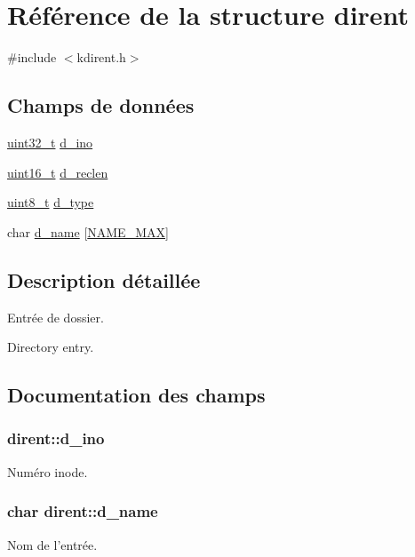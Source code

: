 \hypertarget{structdirent}{\section{Référence de la structure dirent}
\label{structdirent}
}


{\ttfamily \#include $<$kdirent.\+h$>$}

\subsection*{Champs de données}
\begin{DoxyCompactItemize}
\item 
\hyperlink{kernel_2include_2types_8h_a33594304e786b158f3fb30289278f5af}{uint32\+\_\+t} \hyperlink{structdirent_a0ed2e5ea3c71500f628914bf3966e4ba}{d\+\_\+ino}
\item 
\hyperlink{kernel_2include_2types_8h_adf4d876453337156dde61095e1f20223}{uint16\+\_\+t} \hyperlink{structdirent_a7cc67dd4ba5a8bed7f107f249957688d}{d\+\_\+reclen}
\item 
\hyperlink{kernel_2include_2types_8h_aba7bc1797add20fe3efdf37ced1182c5}{uint8\+\_\+t} \hyperlink{structdirent_a948760e3b7f607213a19f85e7af15a32}{d\+\_\+type}
\item 
char \hyperlink{structdirent_a4325a83c49c6f2cd01ef80e1ae1dd4c5}{d\+\_\+name} \mbox{[}\hyperlink{dirent_8h_ac64541bdd81c961304b9babef1402640}{N\+A\+M\+E\+\_\+\+M\+A\+X}\mbox{]}
\end{DoxyCompactItemize}


\subsection{Description détaillée}
Entrée de dossier.

Directory entry. 

\subsection{Documentation des champs}
\hypertarget{structdirent_a0ed2e5ea3c71500f628914bf3966e4ba}{
\subsubsection[{d\+\_\+ino}]{ dirent\+::d\+\_\+ino}}\label{structdirent_a0ed2e5ea3c71500f628914bf3966e4ba}
Numéro inode. \hypertarget{structdirent_a4325a83c49c6f2cd01ef80e1ae1dd4c5}{
\subsubsection[{d\+\_\+name}]{\setlength{\rightskip}{0pt plus 5cm}char dirent\+::d\+\_\+name}}\label{structdirent_a4325a83c49c6f2cd01ef80e1ae1dd4c5}
Nom de l'entrée.

